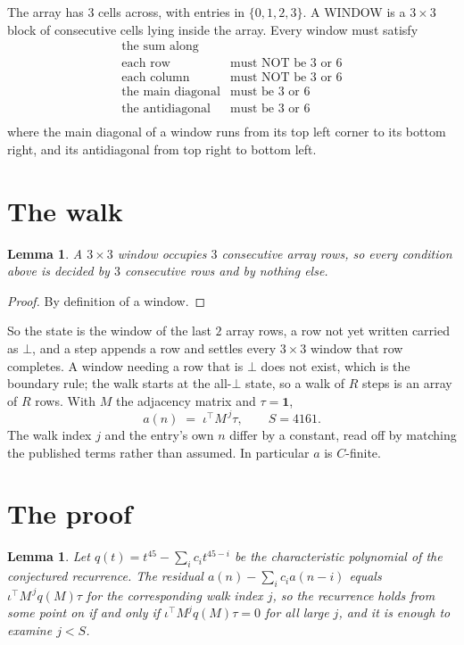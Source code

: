 \documentclass[11pt,a4paper]{article}
\theoremstyle{plain}
\newtheorem{lemma}[theorem]{Lemma}
\theoremstyle{definition}
\begin{document}
The array has $3$ cells across, with entries in $\{0,1,2,3\}$. A WINDOW is a $3\times3$ block
of consecutive cells lying inside the array. Every window must satisfy
\[
\begin{array}{ll}
\text{the sum along} & \text{} \\[2pt]
\text{each row} & \text{must NOT be 3 or 6} \\
\text{each column} & \text{must NOT be 3 or 6} \\
\text{the main diagonal} & \text{must be 3 or 6} \\
\text{the antidiagonal} & \text{must be 3 or 6} \\
\end{array}
\]
where the main diagonal of a window runs from its top left corner to its bottom right, and its
antidiagonal from top right to bottom left.

\section{The walk}

\begin{lemma}\label{lem:win}
A $3\times3$ window occupies $3$ consecutive array rows, so every condition above is
decided by $3$ consecutive rows and by nothing else.
\end{lemma}

\begin{proof}
By definition of a window.
\end{proof}

So the state is the window of the last $2$ array rows, a row not yet written carried as
$\bot$, and a step appends a row and settles every $3\times3$ window that row completes. A
window needing a row that is $\bot$ does not exist, which is the boundary rule; the walk starts
at the all-$\bot$ state, so a walk of $R$ steps is an array of $R$ rows. With $M$ the adjacency
matrix and $\tau=\mathbf{1}$,
\[
a(n)\;=\;\iota^{\!\top}M^{\,j}\tau ,\qquad S=4161.
\]
The walk index $j$ and the entry's own $n$ differ by a constant, read off by matching the
published terms rather than assumed. In particular $a$ is $C$-finite.

\section{The proof}

\begin{lemma}\label{lem:crit}
Let $q(t)=t^{45}-\sum_i c_it^{45-i}$ be the characteristic polynomial of the
conjectured recurrence. The residual $a(n)-\sum_ic_ia(n-i)$ equals
$\iota^{\!\top}M^{\,j}q(M)\tau$ for the corresponding walk index $j$, so the recurrence
holds from some point on if and only if $\iota^{\!\top}M^{j}q(M)\tau=0$ for all large $j$,
and it is enough to examine $j<S$.
\end{lemma}
\end{document}
